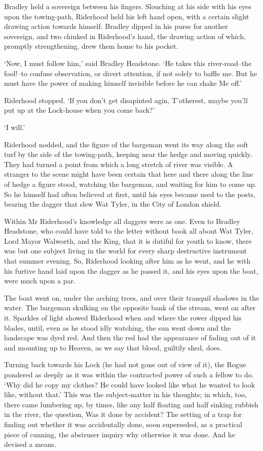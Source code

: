 Bradley held a sovereign between his fingers. Slouching at his side with
his eyes upon the towing-path, Riderhood held his left hand open, with
a certain slight drawing action towards himself. Bradley dipped in his
purse for another sovereign, and two chinked in Riderhood’s hand, the
drawing action of which, promptly strengthening, drew them home to his
pocket.

‘Now, I must follow him,’ said Bradley Headstone. ‘He takes this
river-road--the fool!--to confuse observation, or divert attention, if
not solely to baffle me. But he must have the power of making himself
invisible before he can shake Me off.’

Riderhood stopped. ‘If you don’t get disapinted agin, T’otherest, maybe
you’ll put up at the Lock-house when you come back?’

‘I will.’

Riderhood nodded, and the figure of the bargeman went its way along the
soft turf by the side of the towing-path, keeping near the hedge and
moving quickly. They had turned a point from which a long stretch of
river was visible. A stranger to the scene might have been certain that
here and there along the line of hedge a figure stood, watching the
bargeman, and waiting for him to come up. So he himself had often
believed at first, until his eyes became used to the posts, bearing the
dagger that slew Wat Tyler, in the City of London shield.

Within Mr Riderhood’s knowledge all daggers were as one. Even to Bradley
Headstone, who could have told to the letter without book all about Wat
Tyler, Lord Mayor Walworth, and the King, that it is dutiful for youth
to know, there was but one subject living in the world for every sharp
destructive instrument that summer evening. So, Riderhood looking after
him as he went, and he with his furtive hand laid upon the dagger as he
passed it, and his eyes upon the boat, were much upon a par.

The boat went on, under the arching trees, and over their tranquil
shadows in the water. The bargeman skulking on the opposite bank of the
stream, went on after it. Sparkles of light showed Riderhood when
and where the rower dipped his blades, until, even as he stood idly
watching, the sun went down and the landscape was dyed red. And then the
red had the appearance of fading out of it and mounting up to Heaven, as
we say that blood, guiltily shed, does.

Turning back towards his Lock (he had not gone out of view of it), the
Rogue pondered as deeply as it was within the contracted power of such
a fellow to do. ‘Why did he copy my clothes? He could have looked like
what he wanted to look like, without that.’ This was the subject-matter
in his thoughts; in which, too, there came lumbering up, by times, like
any half floating and half sinking rubbish in the river, the question,
Was it done by accident? The setting of a trap for finding out whether
it was accidentally done, soon superseded, as a practical piece of
cunning, the abstruser inquiry why otherwise it was done. And he devised
a means.

